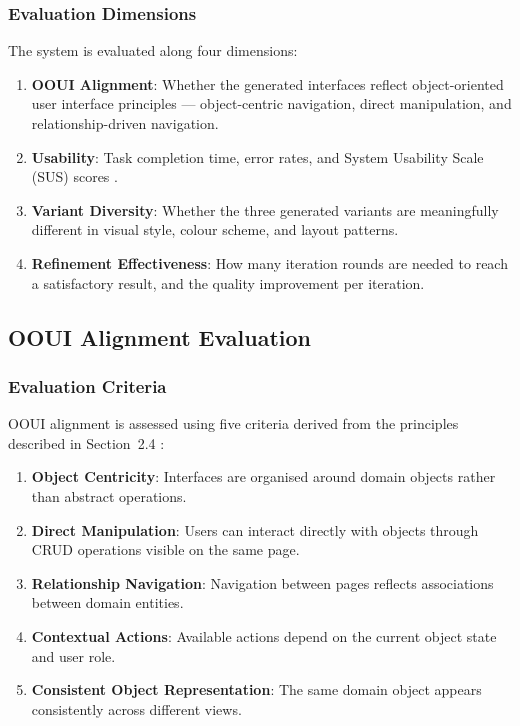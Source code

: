\subsubsection{Evaluation Dimensions}

The system is evaluated along four dimensions:

\begin{enumerate}
    \item \textbf{OOUI Alignment}: Whether the generated interfaces reflect object-oriented user interface principles — object-centric navigation, direct manipulation, and relationship-driven navigation.
    \item \textbf{Usability}: Task completion time, error rates, and System Usability Scale (SUS) scores \cite{vD24}.
    \item \textbf{Variant Diversity}: Whether the three generated variants are meaningfully different in visual style, colour scheme, and layout patterns.
    \item \textbf{Refinement Effectiveness}: How many iteration rounds are needed to reach a satisfactory result, and the quality improvement per iteration.
\end{enumerate}


\subsection{OOUI Alignment Evaluation}

\subsubsection{Evaluation Criteria}

OOUI alignment is assessed using five criteria derived from the principles described in Section~2.4 \cite{Ver25}:

\begin{enumerate}
    \item \textbf{Object Centricity}: Interfaces are organised around domain objects rather than abstract operations.
    \item \textbf{Direct Manipulation}: Users can interact directly with objects through CRUD operations visible on the same page.
    \item \textbf{Relationship Navigation}: Navigation between pages reflects associations between domain entities.
    \item \textbf{Contextual Actions}: Available actions depend on the current object state and user role.
    \item \textbf{Consistent Object Representation}: The same domain object appears consistently across different views.
\end{enumerate}

